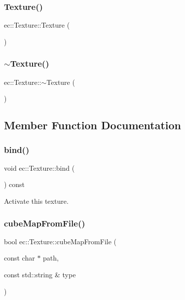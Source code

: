 \subsubsection{\texorpdfstring{Texture()}{Texture()}}
{\footnotesize\ttfamily ec\+::\+Texture\+::\+Texture (\begin{DoxyParamCaption}{ }\end{DoxyParamCaption})\hspace{0.3cm}{\ttfamily [explicit]}}

\mbox{\label{classec_1_1_texture_ae567d80654dd09c6b02a38ca8de29ead}} 
\subsubsection{\texorpdfstring{$\sim$\+Texture()}{~Texture()}}
{\footnotesize\ttfamily ec\+::\+Texture\+::$\sim$\+Texture (\begin{DoxyParamCaption}{ }\end{DoxyParamCaption})\hspace{0.3cm}{\ttfamily [default]}}



\subsection{Member Function Documentation}
\mbox{\label{classec_1_1_texture_a9e2f0191cfcc85c87edb821508cc06ee}} 
\subsubsection{\texorpdfstring{bind()}{bind()}}
{\footnotesize\ttfamily void ec\+::\+Texture\+::bind (\begin{DoxyParamCaption}{ }\end{DoxyParamCaption}) const}

Activate this texture. \mbox{\label{classec_1_1_texture_ae84b0f18fa11275f09e4c8ea3dc89e02}} 
\subsubsection{\texorpdfstring{cube\+Map\+From\+File()}{cubeMapFromFile()}}
{\footnotesize\ttfamily bool ec\+::\+Texture\+::cube\+Map\+From\+File (\begin{DoxyParamCaption}\item[{const char $\ast$}]{path,  }\item[{const std\+::string \&}]{type }\end{DoxyParamCaption})}

